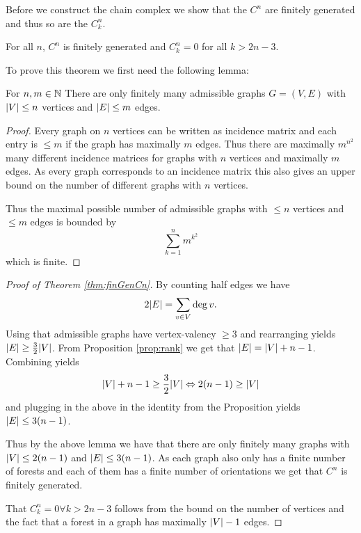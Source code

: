 Before we construct the chain complex we show that the $C^{n}$ are finitely generated and thus so are the $C_{k}^{n}$.

\begin{theorem}\label{thm:finGenCn}
	For all $n$, $C^{n}$ is finitely generated and $C_{k}^{n} = 0$ for all $k > 2n-3$. 
\end{theorem}

To prove this theorem we first need the following lemma:
\begin{lemma}
	For $n,m \in \mathbb{N}$ There are only finitely many admissible graphs $G = (V,E)$ with $\abs{V} \leq n$ vertices and $ \abs{E} \leq m$ edges.
\end{lemma}

\begin{proof}
	Every graph on $n$ vertices can be written as incidence matrix and each entry is $\leq m$ if the graph has maximally $m$ edges. 
	Thus there are maximally $m^{n^2}$ many different incidence matrices for graphs with  $n$ vertices and maximally $m$ edges.
	As every graph corresponds to an incidence matrix this also gives an upper bound on the number of different graphs with $n$ vertices.

	Thus the maximal possible number of admissible graphs with $\leq n$ vertices and $\leq m$ edges is bounded by
	\[
		\sum_{k=1}^{n} m^{k^2} 
	\]
	which is finite.
\end{proof}

\begin{proof}[Proof of Theorem \ref{thm:finGenCn}]
	By counting half edges we have
	\[
		2 \abs{E} = \sum_{v \in V} \deg{v}
	.\] 
	Using that admissible graphs have vertex-valency $\geq 3$ and rearranging yields $\abs{E} \geq \frac{3}{2} \abs{V}$.
	From Proposition \ref{prop:rank} we get that $\abs{E} = \abs{V} + n-1$.
	Combining yields
	\[
		\abs{V} + n -1 \geq \frac{3}{2} \abs{V} \Leftrightarrow 2 (n-1) \geq \abs{V}
	\] 
	and plugging in the above in the identity from the Proposition yields $\abs{E} \leq 3 (n-1)$.

	Thus by the above lemma we have that there are only finitely many graphs with $\abs{V} \leq 2 (n-1)$ and $\abs{E} \leq 3(n-1)$.
	As each graph also only has a finite number of forests and each of them has a finite number of orientations we get that
	$C^{n}$ is finitely generated.

	That $C_{k}^{n} = 0 \forall k > 2n -3$ follows from the bound on the number of vertices and the fact that a forest in a graph has maximally $\abs{V} - 1$ edges.
\end{proof}

